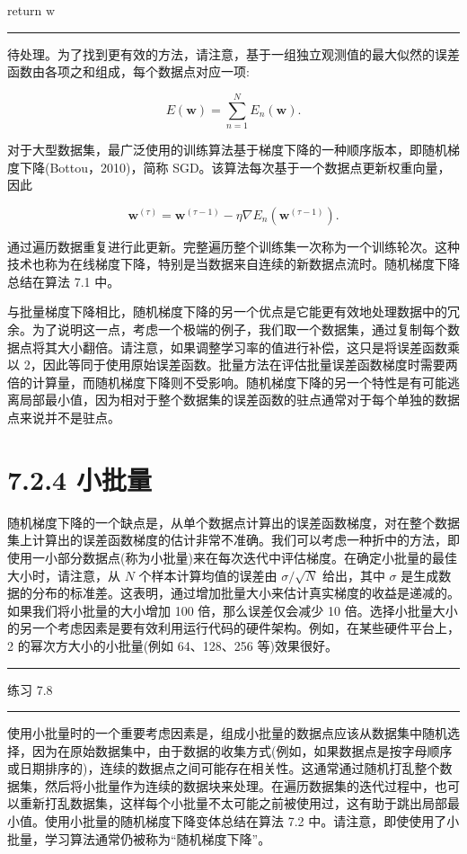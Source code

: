 \documentclass[10pt]{article}
\newcommand{\HRule}{\begin{center}\rule{0.9\linewidth}{0.2mm}\end{center}}
\begin{document}
return \(\mathrm{w}\)

\HRule

待处理。为了找到更有效的方法，请注意，基于一组独立观测值的最大似然的误差函数由各项之和组成，每个数据点对应一项:

\[
E\left( \mathbf{w}\right)  = \mathop{\sum }\limits_{{n = 1}}^{N}{E}_{n}\left( \mathbf{w}\right) . \tag{7.17}
\]

对于大型数据集，最广泛使用的训练算法基于梯度下降的一种顺序版本，即随机梯度下降(Bottou，2010)，简称 SGD。该算法每次基于一个数据点更新权重向量，因此

\[
{\mathbf{w}}^{\left( \tau \right) } = {\mathbf{w}}^{\left( \tau  - 1\right) } - \eta \nabla {E}_{n}\left( {\mathbf{w}}^{\left( \tau  - 1\right) }\right) . \tag{7.18}
\]

通过遍历数据重复进行此更新。完整遍历整个训练集一次称为一个训练轮次。这种技术也称为在线梯度下降，特别是当数据来自连续的新数据点流时。随机梯度下降总结在算法 7.1 中。

与批量梯度下降相比，随机梯度下降的另一个优点是它能更有效地处理数据中的冗余。为了说明这一点，考虑一个极端的例子，我们取一个数据集，通过复制每个数据点将其大小翻倍。请注意，如果调整学习率的值进行补偿，这只是将误差函数乘以 2，因此等同于使用原始误差函数。批量方法在评估批量误差函数梯度时需要两倍的计算量，而随机梯度下降则不受影响。随机梯度下降的另一个特性是有可能逃离局部最小值，因为相对于整个数据集的误差函数的驻点通常对于每个单独的数据点来说并不是驻点。

\section*{7.2.4 小批量}

随机梯度下降的一个缺点是，从单个数据点计算出的误差函数梯度，对在整个数据集上计算出的误差函数梯度的估计非常不准确。我们可以考虑一种折中的方法，即使用一小部分数据点(称为小批量)来在每次迭代中评估梯度。在确定小批量的最佳大小时，请注意，从 \(N\) 个样本计算均值的误差由 \(\sigma /\sqrt{N}\) 给出，其中 \(\sigma\) 是生成数据的分布的标准差。这表明，通过增加批量大小来估计真实梯度的收益是递减的。如果我们将小批量的大小增加 100 倍，那么误差仅会减少 10 倍。选择小批量大小的另一个考虑因素是要有效利用运行代码的硬件架构。例如，在某些硬件平台上，2 的幂次方大小的小批量(例如 64、128、256 等)效果很好。

\HRule

练习 7.8

\HRule

使用小批量时的一个重要考虑因素是，组成小批量的数据点应该从数据集中随机选择，因为在原始数据集中，由于数据的收集方式(例如，如果数据点是按字母顺序或日期排序的)，连续的数据点之间可能存在相关性。这通常通过随机打乱整个数据集，然后将小批量作为连续的数据块来处理。在遍历数据集的迭代过程中，也可以重新打乱数据集，这样每个小批量不太可能之前被使用过，这有助于跳出局部最小值。使用小批量的随机梯度下降变体总结在算法 7.2 中。请注意，即使使用了小批量，学习算法通常仍被称为“随机梯度下降”。
\end{document}
